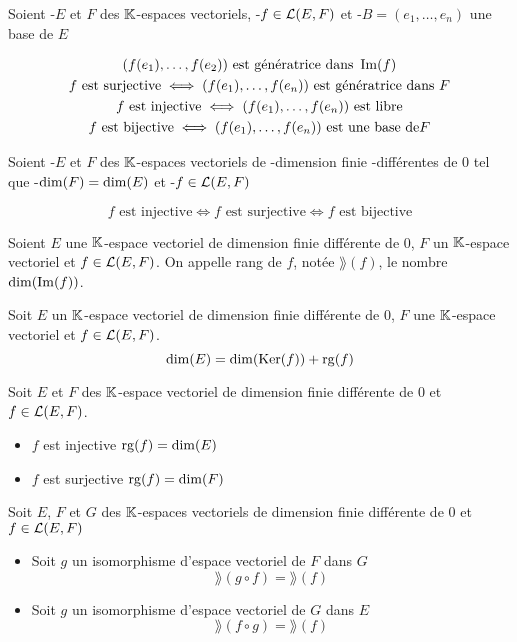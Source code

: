 \begin{prp}
Soient \hyp{$E$ et $F$ des $\mathbb{K}$-espaces vectoriels},
\hyp{$f \in \operatorname{\mathcal{L}}(E, F)$} et \hyp{$B = (e_1, \ldots, e_n)$ une base de $E$}

\begin{gather*}
    (f(e_1), \ldots, f(e_2)) \text{ est génératrice dans } \operatorname{Im}(f) \\
    f \text{ est surjective} \iff (f(e_1), \ldots, f(e_n)) \text{ est
    génératrice dans } F \\
    f \text{ est injective} \iff (f(e_1), \ldots, f(e_n)) \text{ est
    libre} \\
    f \text{ est bijective} \iff (f(e_1), \ldots, f(e_n)) \text{ est
    une base de} F
\end{gather*}
\end{prp}

\begin{prp}
Soient \hyp{$E$ et $F$ des $\mathbb{K}$-espaces vectoriels} de
\hyp{dimension finie} \hyp{différentes de $0$} tel que
\hyp{$\operatorname{dim}(F) = \operatorname{dim}(E)$} et \hyp{$f \in \operatorname{\mathcal{L}}(E, F)$}

\[
    f \text{ est injective} \iff f \text{ est surjective}
    \iff f \text{ est bijective}
\]
\end{prp}

\begin{dfn}
Soient $E$ une $\mathbb{K}$-espace vectoriel de dimension finie différente de $0$,
$F$ un $\mathbb{K}$-espace vectoriel et $f \in \operatorname{\mathcal{L}}(E, F)$. On appelle rang de $f$,
notée $\rang(f)$, le nombre $\operatorname{dim}(\operatorname{Im}(f))$.
\end{dfn}

\begin{thm}[du rang]
Soit $E$ un $\mathbb{K}$-espace vectoriel de dimension finie différente de $0$,
$F$ une $\mathbb{K}$-espace vectoriel et $f \in \operatorname{\mathcal{L}}(E, F)$.
\[
    \operatorname{dim}(E) = \operatorname{dim}(\operatorname{Ker}(f)) + \operatorname{rg}(f)
\]
\end{thm}

\begin{prp}
Soit $E$ et $F$ des $\mathbb{K}$-espace vectoriel de dimension finie différente de
$0$ et $f \in \operatorname{\mathcal{L}}(E, F)$.
\begin{itemize}
    \item $f$ est injective \ssi $\operatorname{rg}(f) = \operatorname{dim}(E)$
    \item $f$ est surjective \ssi $\operatorname{rg}(f) = \operatorname{dim}(F)$
\end{itemize}
\end{prp}

\begin{prp}
Soit $E$, $F$ et $G$ des $\mathbb{K}$-espaces vectoriels de dimension finie
différente de $0$ et $f \in \operatorname{\mathcal{L}}(E, F)$
\begin{itemize}
    \item Soit $g$ un isomorphisme d'espace vectoriel de $F$ dans $G$
    \[
        \rang(g \circ f) = \rang(f)
    \]
    \item Soit $g$ un isomorphisme d'espace vectoriel de $G$ dans
    $E$
    \[
        \rang(f \circ g) = \rang(f)
    \]
\end{itemize}
\end{prp}



